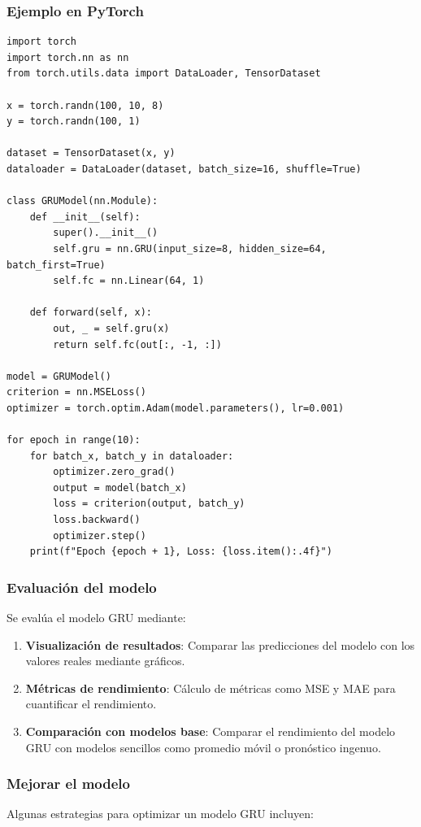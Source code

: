 \documentclass[11pt]{article}
\begin{document}
\subsubsection{Ejemplo en PyTorch}
\label{sec:org8961d24}
\begin{verbatim}
import torch
import torch.nn as nn
from torch.utils.data import DataLoader, TensorDataset

x = torch.randn(100, 10, 8)
y = torch.randn(100, 1)

dataset = TensorDataset(x, y)
dataloader = DataLoader(dataset, batch_size=16, shuffle=True)

class GRUModel(nn.Module):
    def __init__(self):
        super().__init__()
        self.gru = nn.GRU(input_size=8, hidden_size=64, batch_first=True)
        self.fc = nn.Linear(64, 1)

    def forward(self, x):
        out, _ = self.gru(x)
        return self.fc(out[:, -1, :])

model = GRUModel()
criterion = nn.MSELoss()
optimizer = torch.optim.Adam(model.parameters(), lr=0.001)

for epoch in range(10):
    for batch_x, batch_y in dataloader:
        optimizer.zero_grad()
        output = model(batch_x)
        loss = criterion(output, batch_y)
        loss.backward()
        optimizer.step()
    print(f"Epoch {epoch + 1}, Loss: {loss.item():.4f}")
\end{verbatim}

\subsubsection{Evaluación del modelo}
\label{sec:orgff38a85}
Se evalúa el modelo GRU mediante:

\begin{enumerate}
\item \textbf{\textbf{Visualización de resultados}}: Comparar las predicciones del modelo con los valores reales mediante gráficos.

\item \textbf{\textbf{Métricas de rendimiento}}: Cálculo de métricas como MSE y MAE para cuantificar el rendimiento.

\item \textbf{\textbf{Comparación con modelos base}}: Comparar el rendimiento del modelo GRU con modelos sencillos como promedio móvil o pronóstico ingenuo.
\end{enumerate}

\subsubsection{Mejorar el modelo}
\label{sec:orga49b008}
Algunas estrategias para optimizar un modelo GRU incluyen:
\end{document}

